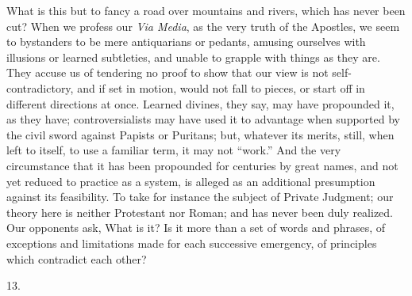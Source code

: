 What is this but to fancy a road over mountains and rivers, which
has never been cut? When we profess our \emph{Via Media}, as the very
truth of the Apostles, we seem to bystanders to be mere antiquarians
or pedants, amusing ourselves with illusions or learned subtleties,
and unable to grapple with things as they are. They accuse us of
tendering no proof to show that our view is not self-contradictory,
and if set in motion, would not fall to pieces, or start off in
different directions at once. Learned divines, they say, may have
propounded it, as they have; controversialists may have used it to
advantage when supported by the civil sword against Papists or
Puritans; but, whatever its merits, still, when left to itself, to use
a familiar term, it may not ``work.'' And the very
circumstance that it has been propounded for centuries by great names,
and not yet reduced to practice as a system, is alleged as an
additional presumption against its feasibility. To take for instance
the subject of Private Judgment; our theory here is neither Protestant
nor Roman; and has never been duly realized. Our opponents ask, What
is it? Is it more than a set of words and phrases, of exceptions and
limitations made for each successive emergency, of principles which
contradict each other?

13.

